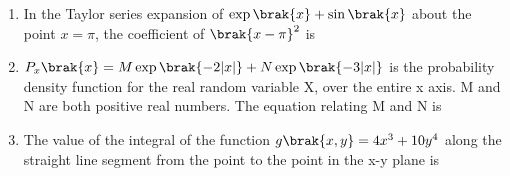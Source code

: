 \documentclass[a4paper, 11pt]{article}
\begin{document}
\begin{enumerate}
    \hfill{}

    \item In the Taylor series expansion of $\exp\brak{x}+\sin\brak{x}$ about the point $x=\pi$, the coefficient of $\brak{x-\pi}^2$ is
    \begin{enumerate}
    \end{enumerate}
    
    \hfill{}

    \item $P_x\brak{x}=M\exp\brak{-2|x|}+N\exp\brak{-3|x|}$ is the probability density function for the real random variable X, over the entire x axis. M and N are both positive real numbers. The equation relating M and N is
    
    \begin{enumerate}
    \end{enumerate}
    
    \hfill{}
    
    \item The value of the integral of the function $g\brak{x,y}=4x^3+10y^4$ along the straight line segment from the point  to the point  in the x-y plane is
    
    \begin{enumerate}
    \end{enumerate}
    

\end{enumerate}
\end{document}
